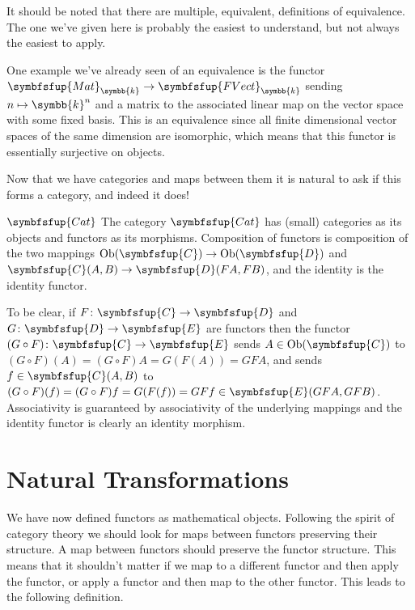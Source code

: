 \documentclass[fleqn]{NotesClass}
\makeatletter
\newcommand{\cat}[1]{\symbfsfup{#1}}
\newcommand{\c@egory}[1]{\symbfsfup{#1}}
\renewcommand{\field}{\symbb{k}}
\newcommand{\Mat}[1][\field]{{\c@egory{Mat}_{#1}}}
\newcommand{\FVect}[1][\field]{{\c@egory{FVect}_{#1}}}
\newcommand{\Cat}{\c@egory{Cat}}
\DeclareMathOperator{\Ob}{Ob}
\makeatother
\begin{document}
    It should be noted that there are multiple, equivalent, definitions of equivalence.
    The one we've given here is probably the easiest to understand, but not always the easiest to apply.
    
    One example we've already seen of an equivalence is the functor \(\Mat \to \FVect\) sending \(n \mapsto \field^n\) and a matrix to the associated linear map on the vector space with some fixed basis.
    This is an equivalence since all finite dimensional vector spaces of the same dimension are isomorphic, which means that this functor is essentially surjective on objects.
    
    Now that we have categories and maps between them it is natural to ask if this forms a category, and indeed it does!
    
    \begin{dfn}{\normalsize\(\Cat\)}{}
        The category \(\Cat\)\index{Cat@\(\Cat\)} has (small) categories as its objects and functors as its morphisms.
        Composition of functors is composition of the two mappings \(\Ob(\cat{C}) \to \Ob(\cat{D})\) and \(\cat{C}(A, B) \to \cat{D}(FA, FB)\), and the identity is the identity functor.
    \end{dfn}
    
    To be clear, if \(F \colon \cat{C} \to \cat{D}\) and \(G \colon \cat{D} \to \cat{E}\) are functors then the functor \((G \circ F) \colon \cat{C} \to \cat{E}\) sends \(A \in \Ob(\cat{C})\) to \((G \circ F)(A) = (G \circ F)A = G(F(A)) = GFA\), and sends \(f \in \cat{C}(A, B)\) to \((G \circ F)(f) = (G \circ F)f = G(F(f)) = GFf \in \cat{E}(GFA, GFB)\).
    Associativity is guaranteed by associativity of the underlying mappings and the identity functor is clearly an identity morphism.
    
    \section{Natural Transformations}
    We have now defined functors as mathematical objects.
    Following the spirit of category theory we should look for maps between functors preserving their structure.
    A map between functors should preserve the functor structure.
    This means that it shouldn't matter if we map to a different functor and then apply the functor, or apply a functor and then map to the other functor.
    This leads to the following definition.
    
\end{document}
